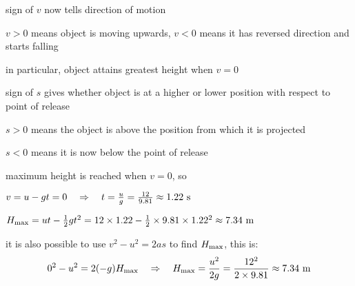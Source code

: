 \cmt sign of $v$ now tells direction of motion

$v>0$ means object is moving upwards, $v<0$ means it has reversed direction and starts falling

in particular, object attains greatest height when $v=0$

\cmt sign of $s$ gives whether object is at a higher or lower position with respect to point of release

$s>0$ means the object is above the position from which it is projected

$s<0$ means it is now below the point of release

	
\begin{soln} maximum height is reached when $v=0$, so

	\centering
	
	$v = u-gt = 0 \quad \Rightarrow \quad t= \frac{u}{g} = \frac{12}{9.81} \approx 1.22 \text{ s}$
	
	$H_{\text{max}} = ut-\frac{1}{2}gt^2 = 12\times1.22 - \frac{1}{2}\times9.81\times1.22^2 \approx 7.34 \text{ m}$
	
\end{soln}

it is also possible to use $v^2 - u^2 = 2as$ to find $H_{\text{max}}$, this is:
\begin{equation*}
0^2 - u^2 = 2(-g)H_{\text{max}} \quad \Rightarrow \quad H_{\text{max}} = \frac{u^2}{2g} = \frac{12^2}{2\times9.81} \approx 7.34 \text{ m} 
\end{equation*}

